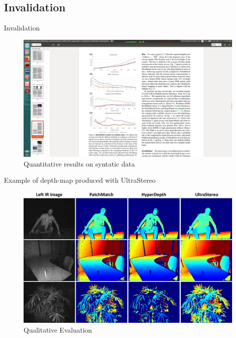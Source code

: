 \documentclass{beamer}
\begin{document}
\subsection{Invalidation}
\begin{frame}{Invalidation}
\begin{figure}
\includegraphics[scale=0.08]{pictures/fig3}
\caption{Quantitative results on syntatic data}
\end{figure}
\end{frame}

\begin{frame}{Example of depth-map produced with UltraStereo}
\begin{figure}
\includegraphics[scale=0.08]{pictures/fig5}
\caption{Qualitative Evaluation}
\end{figure}
\end{frame}
\end{document}
